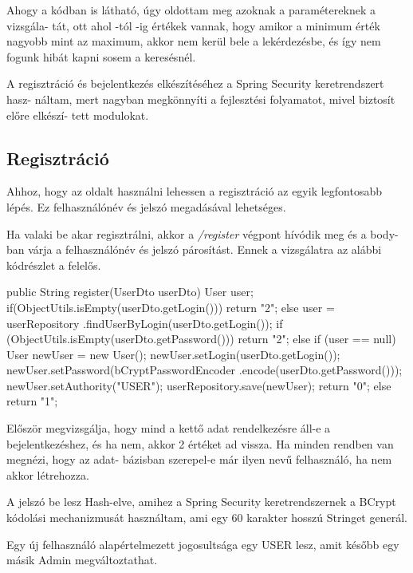 Ahogy a kódban is látható, úgy oldottam meg azoknak a paramétereknek a vizsgála-
tát, ott ahol -tól -ig értékek vannak, hogy amikor a minimum érték nagyobb mint az maximum, akkor nem kerül bele a lekérdezésbe, és így nem fogunk hibát kapni sosem a keresésnél.

A regisztráció és bejelentkezés elkészítéséhez a Spring Security keretrendszert \cite{SpringSecurity} hasz-
náltam, mert nagyban megkönnyíti a fejlesztési folyamatot, mivel biztosít előre elkészí-
tett modulokat.

\subsection{Regisztráció}
Ahhoz, hogy az oldalt használni lehessen  a regisztráció az egyik legfontosabb lépés. Ez felhasználónév és  jelszó megadásával lehetséges. 

Ha valaki be akar regisztrálni, akkor a  \textit{/register} végpont hívódik meg és a body-ban várja a felhasználónév és jelszó párosítást. Ennek a vizsgálatra az alábbi kódrészlet a felelős.

\begin{java}
public String register(UserDto userDto) {
    User user;
    if(ObjectUtils.isEmpty(userDto.getLogin())) {
      return "2";
    } else {
        user = userRepository
          .findUserByLogin(userDto.getLogin());
    }
    if (ObjectUtils.isEmpty(userDto.getPassword())) {
      return "2";
    } else {
        if (user == null) {
           User newUser = new User();
           newUser.setLogin(userDto.getLogin());
           newUser.setPassword(bCryptPasswordEncoder
                      .encode(userDto.getPassword()));
           newUser.setAuthority("USER");
           userRepository.save(newUser); 
           return "0";
        } else {
           return "1";
        }
    }
}
\end{java}

Először megvizsgálja, hogy mind a kettő adat rendelkezésre áll-e a bejelentkezéshez, és ha nem, akkor 2 értéket ad vissza. Ha minden rendben van megnézi, hogy az adat-
bázisban szerepel-e már ilyen nevű felhasználó, ha nem akkor létrehozza.


A jelszó be lesz Hash-elve, amihez a Spring Security  keretrendszernek a BCrypt kódolási mechanizmusát használtam, ami egy 60 karakter hosszú Stringet generál.

Egy új felhasználó alapértelmezett jogosultsága egy USER lesz, amit később egy másik Admin megváltoztathat.

